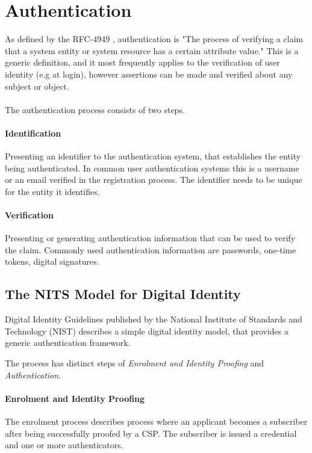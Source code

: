 \section{Authentication}

As defined by the RFC-4949 \cite{shirey2007internet}, authentication is "The process of verifying a claim that a system entity or system resource has a certain attribute value."
This is a generic definition, and it most frequently applies to the verification of user identity (e.g at login), however assertions can be made and verified about any subject or object.
\\
\\
The authentication process consists of two steps.
\paragraph{Identification} Presenting an identifier to the authentication system, that establishes the entity being authenticated.
In common user authentication systems this is a username or an email verified in the registration process. The identifier needs to be unique for the entity it identifies.

\paragraph{Verification} Presenting or generating authentication information that can be used to verify the claim.
Commonly used authentication information are passwords, one-time tokens, digital signatures.

\subsection{The NITS Model for Digital Identity}

Digital Identity Guidelines \cite{grassi2017} published by the National Institute of Standards and Technology (NIST) describes a simple digital identity model, that provides a generic authentication framework.

The process has distinct steps of \textit{Enrolment and Identity Proofing} and \textit{Authentication}.

\paragraph{Enrolment and Identity Proofing}

The enrolment process describes process where an applicant becomes a subscriber after being successfully proofed by a CSP.
The subscriber is issued a credential and one or more authenticators.


